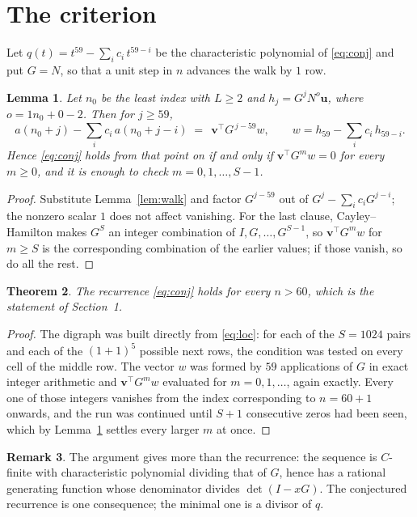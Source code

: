 \documentclass[11pt,a4paper]{article}
\theoremstyle{plain}
\newtheorem{theorem}{Theorem}
\newtheorem{lemma}[theorem]{Lemma}
\theoremstyle{definition}
\newtheorem{remark}[theorem]{Remark}
\begin{document}
\section{The criterion}

Let $q(t)=t^{59}-\sum_i c_i\,t^{59-i}$ be the characteristic polynomial of
\eqref{eq:conj} and put $G=N$, so that a unit step in $n$ advances the walk by
$1$ row.

\begin{lemma}\label{lem:crit}
Let $n_0$ be the least index with $L\ge2$ and $h_j=G^{j}N^{o}\mathbf{u}$, where
$o=1n_0+0-2$. Then for $j\ge59$,
\[
a(n_0+j)-\sum_i c_i\,a(n_0+j-i)\;=\;\,\mathbf{v}^{\!\top}G^{\,j-59}w,
\qquad w=h_{59}-\sum_i c_i\,h_{59-i} .
\]
Hence \eqref{eq:conj} holds from that point on if and only if
$\mathbf{v}^{\!\top}G^{m}w=0$ for every $m\ge0$, and it is enough to check
$m=0,1,\dots,S-1$.
\end{lemma}

\begin{proof}
Substitute Lemma~\ref{lem:walk} and factor $G^{j-59}$ out of
$G^{j}-\sum_ic_iG^{j-i}$; the nonzero scalar $1$ does not affect
vanishing. For the last clause, Cayley--Hamilton makes $G^{S}$ an integer combination of
$I,G,\dots,G^{S-1}$, so $\mathbf{v}^{\!\top}G^{m}w$ for $m\ge S$ is the corresponding
combination of the earlier values; if those vanish, so do all the rest.
\end{proof}

\begin{theorem}
The recurrence \eqref{eq:conj} holds for every $n>60$, which is the statement of
Section~1.
\end{theorem}

\begin{proof}
The digraph was built directly from \eqref{eq:loc}: for each of the $S=1024$ pairs and each
of the $(1+1)^{5}$ possible next rows, the condition was tested on every cell of
the middle row. The vector $w$ was formed by $59$ applications of $G$ in exact integer
arithmetic and $\mathbf{v}^{\!\top}G^{m}w$ evaluated for $m=0,1,\dots$, again exactly.
Every one of those integers vanishes from the index corresponding to $n=60+1$ onwards,
and the run was continued until $S+1$ consecutive zeros had been seen, which by
Lemma~\ref{lem:crit} settles every larger $m$ at once.
\end{proof}

\begin{remark}
The argument gives more than the recurrence: the sequence is $C$-finite with characteristic
polynomial dividing that of $G$, hence has a rational generating function whose denominator
divides $\det(I-xG)$. The conjectured recurrence is one consequence; the minimal one is a
divisor of $q$.
\end{remark}
\end{document}

